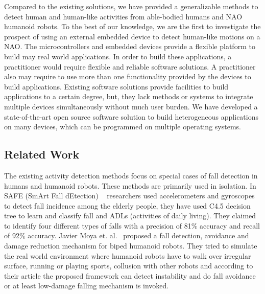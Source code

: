 \documentclass[letterpaper]{article}
\begin{document}
Compared to the existing solutions, we have provided a generalizable methods to detect human  and 
human-like activities from able-bodied humans and NAO humanoid robots. To the best of our 
knowledge, we are the 
first to investigate the prospect of using an external embedded device to detect human-like motions 
on a NAO. The microcontrollers and embedded devices provide a flexible platform to 
build may real world applications. In order to build these applications, a practitioner would 
require  flexible and reliable software solutions. A practitioner also may require to use more than 
one functionality provided by the devices to build applications. Existing software solutions 
provide facilities to build applications to a certain degree, but, they lack methods or systems to 
integrate multiple devices simultaneously without much user burden. We have developed  
a state-of-the-art open source software solution to build heterogeneous applications on many 
devices, which can be programmed on multiple operating systems. 

\subsection{Related Work}

The existing activity detection methods focus on special cases of fall detection in humans and 
humanoid robots. These methods are primarily used in isolation.  
In SAFE (SmArt Fall dEtection) {~\cite{ojetola2011fall}} researchers used accelerometers and 
gyroscopes 
to detect fall incidence among the elderly people, they have used C4.5 decision tree to learn and 
classify fall and ADLs (activities of daily living). They claimed to identify four different types 
of falls with a precision of 81\% accuracy and recall of 92\% accuracy.
Javier Moya et. al.{~\cite{moya2014fall}} proposed a fall detection, avoidance and damage reduction 
mechanism for biped humanoid robots. They tried to simulate the real world environment where 
humanoid robots have to walk over irregular surface, running or playing sports, collusion with 
other 
robots and according to their article the proposed framework can detect instability and do fall 
avoidance or at least low-damage falling mechanism is invoked. 
\end{document}
